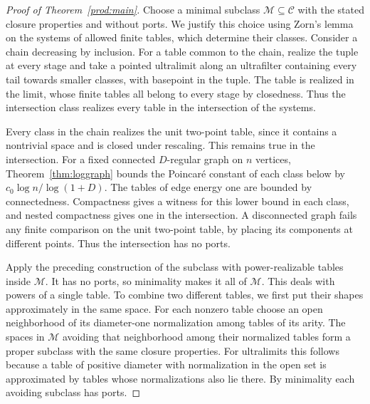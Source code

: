 \begin{proof}[Proof of Theorem~\ref{prod:main}]
Choose a minimal subclass $\mathcal M\subseteq\mathcal C$ with the
stated closure properties and without ports. We justify this choice
using Zorn's lemma on the systems of allowed finite tables, which
determine their classes. Consider a chain decreasing by inclusion.
For a table common to the chain, realize the tuple at every stage
and take a pointed ultralimit along an ultrafilter containing every
tail towards smaller classes, with basepoint in the tuple. The table
is realized in the limit, whose finite tables all belong to every
stage by closedness. Thus the intersection class realizes every table
in the intersection of the systems.

Every class in the chain realizes the unit two-point table, since it
contains a nontrivial space and is closed under rescaling. This remains
true in the intersection. For a fixed connected $D$-regular graph on
$n$ vertices, Theorem~\ref{thm:loggraph} bounds the Poincar\'e constant of each class below
by $c_0\log n/\log(1+D)$. The tables of edge energy one are bounded
by connectedness. Compactness gives a
witness for this lower bound in each class, and nested compactness
gives one in the intersection. A disconnected graph fails any finite
comparison on the unit two-point table, by placing its components
at different points. Thus the intersection has no ports.

Apply the preceding construction of the subclass with power-realizable
tables inside $\mathcal M$. It has no ports, so minimality makes it
all of $\mathcal M$. This deals with powers of a single table. To
combine two different tables, we first put their shapes approximately
in the same space. For each nonzero table choose an open neighborhood
of its diameter-one normalization among tables of its arity. The
spaces in $\mathcal M$ avoiding that neighborhood among their normalized
tables form a proper subclass with the same closure properties. For
ultralimits this follows because a table of positive diameter with
normalization in the open set is approximated by tables whose
normalizations also lie there. By minimality each avoiding subclass
has ports.


\end{proof}
